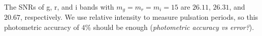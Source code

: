 \documentclass[letterpaper,11pt]{article}
\begin{document}
\vspace{3mm} %

\noindent The SNRs of g, r, and i bands with $m_g = m_r = m_i = 15$ are $26.11$, $26.31$, and $20.67$, respectively. We use relative intensity to measure pulsation periods, so this photometric accuracy of $4 \%$ should be enough (\textit{photometric accuracy vs error?}).
\end{document}
